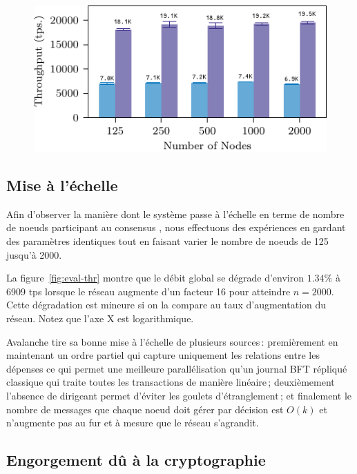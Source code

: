 \begin{figure}
\includegraphics[width=\linewidth]{figures/thr-raw.pdf}
\label{fig:eval-thr-raw}
\end{figure}

\subsection{Mise à l'échelle}

Afin d'observer la manière dont le système passe à l'échelle en terme de nombre de noeuds participant au consensus
{\sysname}, nous effectuons des expériences en gardant des paramètres identiques tout en faisant varier le
nombre de noeuds de 125 jusqu'à 2000.

La figure~\ref{fig:eval-thr} montre que le débit global se dégrade d'environ $1.34\%$ à 6909 tps lorsque le
réseau augmente d'un facteur 16 pour atteindre $n = 2000$. Cette dégradation est mineure si on la compare au
taux d'augmentation du réseau. Notez que l'axe X est logarithmique.

Avalanche tire sa bonne mise à l'échelle de plusieurs sources\,: premièrement en maintenant un ordre partiel qui
capture uniquement les relations entre les dépenses ce qui permet une meilleure parallélisation qu'un journal
BFT répliqué classique qui traite toutes les transactions de manière linéaire\,; deuxièmement l'absence de dirigeant
permet d'éviter les goulets d'étranglement\,; et finalement le nombre de messages que chaque noeud doit gérer par
décision est $O(k)$ et n'augmente pas au fur et à mesure que le réseau s'agrandit.

\subsection{Engorgement dû à la cryptographie}

